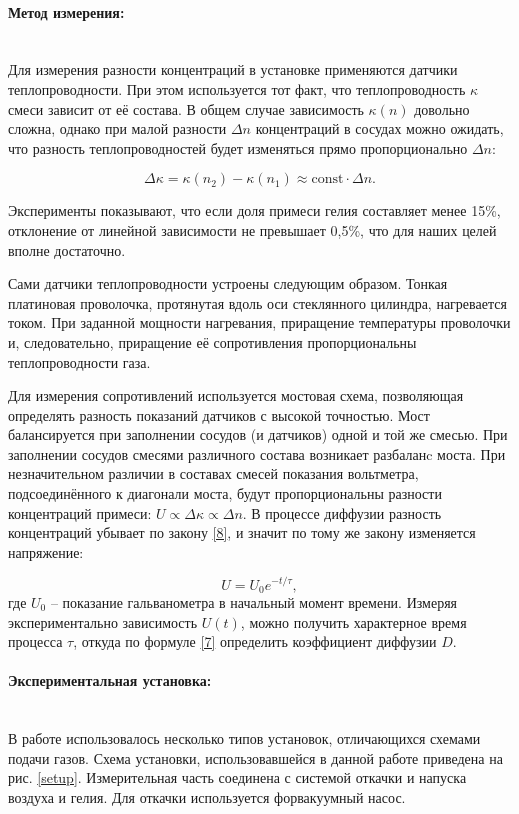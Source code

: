 \documentclass[a4paper, 12pt]{article}
\newcommand{\parag}[1]{\paragraph*{#1:}}
\begin{document}
\parag {Метод измерения}~\\

Для измерения разности концентраций в установке применяются датчики теплопроводности. При этом используется тот факт, что теплопроводность $ \kappa $ смеси зависит от её состава. В общем случае зависимость $ \kappa(n) $ довольно сложна, однако при малой разности $ \Delta n $ концентраций в сосудах можно ожидать, что разность теплопроводностей будет изменяться прямо пропорционально $ \Delta n $:

\[ \Delta \kappa = \kappa(n_2)-\kappa(n_1)\approx\text{const}\cdot\Delta n. \]

Эксперименты показывают, что если доля примеси гелия составляет менее
15\%, отклонение от линейной зависимости не превышает 0,5\%, что для наших целей вполне достаточно.

Сами датчики теплопроводности устроены следующим образом. Тонкая платиновая проволочка, протянутая вдоль оси стеклянного цилиндра, нагревается током. При заданной мощности нагревания, приращение температуры проволочки и, следовательно, приращение её сопротивления пропорциональны теплопроводности газа.

Для измерения сопротивлений используется мостовая схема, позволяющая определять разность показаний датчиков с высокой точностью. Мост балансируется при заполнении сосудов (и датчиков) одной и той же смесью. При заполнении сосудов смесями различного состава возникает разбаланc моста. При незначительном различии в составах смесей показания вольтметра, подсоединённого к диагонали моста, будут пропорциональны разности концентраций примеси: $ U\propto\Delta\kappa\propto\Delta n $. В процессе диффузии разность концентраций убывает по закону \eqref{8}, и значит по тому же закону изменяется напряжение:

\begin{equation}
    \label{10}
    U=U_0e^{-t/\tau},
\end{equation}
где $ U_0 $ -- показание гальванометра в начальный момент времени. Измеряя экспериментально зависимость $ U(t) $, можно получить характерное время
процесса $ \tau $, откуда по формуле \eqref{7} определить коэффициент диффузии $ D $.
    

\parag {Экспериментальная установка}~\\
В работе использовалось несколько типов установок, отличающихся схемами подачи газов. Схема установки, использовавшейся в данной работе приведена на рис. \ref{setup}. Измерительная часть соединена с системой откачки и напуска воздуха и гелия. Для откачки используется форвакуумный насос.
\end{document}
